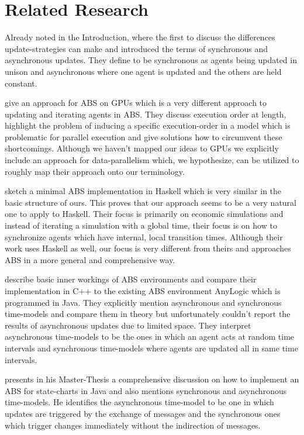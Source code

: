 \section{Related Research}
Already noted in the Introduction, \cite{huberman_evolutionary_1993} where the first to discuss the differences update-strategies can make and introduced the terms of synchronous and asynchronous updates. They define to be synchronous as agents being updated in unison and asynchronous where one agent is updated and the others are held constant.

\medskip

\cite{a_framework_2008} give an approach for ABS on GPUs which is a very different approach to updating and iterating agents in ABS. They discuss execution order at length, highlight the problem of inducing a specific execution-order in a model which is problematic for parallel execution and give solutions how to circumvent these shortcomings. Although we haven't mapped our ideas to GPUs we explicitly include an approach for data-parallelism which, we hypothesize, can be utilized to roughly map their approach onto our terminology. 
	
\medskip
	
\cite{botta_time_2010} sketch a minimal ABS implementation in Haskell which is very similar in the basic structure of ours. This proves that our approach seems to be a very natural one to apply to Haskell. Their focus is primarily on economic simulations and instead of iterating a simulation with a global time, their focus is on how to synchronize agents which have internal, local transition times. Although their work uses Haskell as well, our focus is very different from theirs and approaches ABS in a more general and comprehensive way.

\medskip

\cite{dawson_opening_2014} describe basic inner workings of ABS environments and compare their implementation in C++ to the existing ABS environment AnyLogic which is programmed in Java. They explicitly mention asynchronous and synchronous time-models and compare them in theory but unfortunately couldn't report the results of asynchronous updates due to limited space. They interpret asynchronous time-models to be the ones in which an agent acts at random time intervals and synchronous time-models where agents are updated all in same time intervals.

\medskip

\cite{yuxuan_agent-based_2016} presents in his Master-Thesis a comprehensive discussion on how to implement an ABS for state-charts in Java and also mentions synchronous and asynchronous time-models. He identifies the asynchronous time-model to be one in which updates are triggered by the exchange of messages and the synchronous ones which trigger changes immediately without the indirection of messages.

